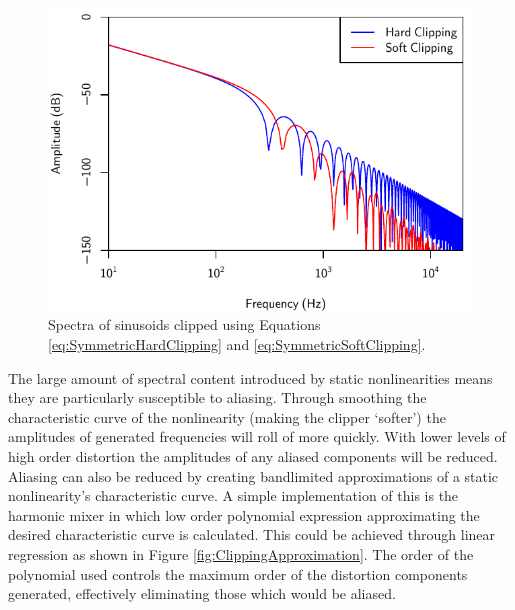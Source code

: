 			\begin{figure}[h!]
				\centering
				\includegraphics{chapter5/Images/ClippingSpectra.pdf}
				\caption{Spectra of sinusoids clipped using Equations \ref{eq:SymmetricHardClipping} and
			                 \ref{eq:SymmetricSoftClipping}.}
				\label{fig:ClippingSpectra}
			\end{figure}

			The large amount of spectral content introduced by static nonlinearities means they are
			particularly susceptible to aliasing. Through smoothing the characteristic curve of the
			nonlinearity (making the clipper `softer') the amplitudes of generated frequencies will roll of
			more quickly. With lower levels of high order distortion the amplitudes of any aliased components
			will be reduced. Aliasing can also be reduced by creating bandlimited approximations of a static
			nonlinearity's characteristic curve. A simple implementation of this is the harmonic mixer
			\citep{schattschneider1999discrete} in which low order polynomial expression approximating the
			desired characteristic curve is calculated.  This could be achieved through linear regression as
			shown in Figure \ref{fig:ClippingApproximation}. The order of the polynomial used controls the
			maximum order of the distortion components generated, effectively eliminating those which would be
			aliased.


